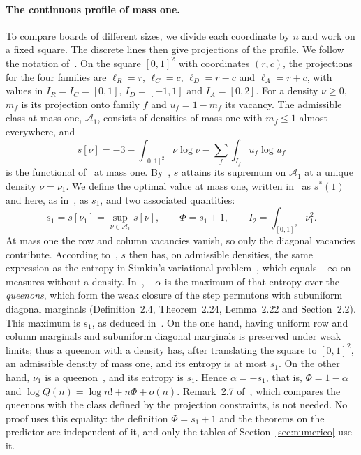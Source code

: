 \paragraph{The continuous profile of mass one.}
To compare boards of different sizes, we divide each coordinate by $n$ and work on a fixed square.
The discrete lines then give projections of the profile.
We follow the notation of~\cite{Perfil}. On the square $[0,1]^2$ with coordinates $(r,c)$, the
projections for the four families are $\ell_R=r$, $\ell_C=c$, $\ell_D=r-c$ and $\ell_A=r+c$, with
values in $I_R=I_C=[0,1]$, $I_D=[-1,1]$ and $I_A=[0,2]$. For a density $\nu\ge0$, $m_f$ is its
projection onto family $f$ and $u_f=1-m_f$ its vacancy. The admissible class at mass one,
$\mathcal A_1$, consists of densities of mass one with $m_f\le1$ almost everywhere, and
\[
 s[\nu]=-3-\int_{[0,1]^2}\nu\log\nu-\sum_{f}\int_{I_f}u_f\log u_f
\]
is the functional of~\cite[(1.1)]{Perfil} at mass one. By~\cite[Theorem~1.1]{Perfil}, $s$ attains its
supremum on $\mathcal A_1$ at a unique density $\nu=\nu_1$. We define the optimal value at mass
one, written in~\cite{Perfil} as $s^*(1)$ and here, as in~\cite{Completabilidad}, as $s_1$, and two
associated quantities:
\begin{equation}\label{eq:s1}
 s_1=s[\nu_1]=\sup_{\nu\in\mathcal A_1}s[\nu],\qquad \Phi=s_1+1,\qquad I_2=\int_{[0,1]^2}\nu_1^2 .
\end{equation}
At mass one the row and column vacancies vanish, so only the diagonal vacancies contribute.
According to~\cite[Remark~2.3]{Perfil}, $s$ then has, on admissible densities, the same expression as the
entropy
in Simkin's variational problem~\cite[Definition~2.9]{Simkin}, which equals $-\infty$ on measures without
a density. In~\cite{Simkin}, $-\alpha$ is the maximum of that entropy over the \emph{queenons}, which form
the
weak closure of the step permutons with subuniform diagonal marginals (Definition~2.4,
Theorem~2.24, Lemma~2.22 and Section~2.2). This maximum is $s_1$, as deduced
in~\cite[Section~2.4]{Completabilidad}. On the one hand, having uniform row and column marginals and
subuniform diagonal marginals is preserved under weak limits; thus a queenon with a density has, after
translating the square to $[0,1]^2$, an admissible density of mass one, and its entropy is at most $s_1$.
On the other hand, $\nu_1$ is a queenon~\cite[Lemma~2.4]{Completabilidad}, and its entropy is $s_1$.
Hence $\alpha=-s_1$, that is, $\Phi=1-\alpha$ and $\log Q(n)=\log n!+n\Phi+o(n)$. Remark~2.7
of~\cite{Simkin}, which compares the queenons with the class defined by the projection constraints, is
not needed. No proof uses this equality: the definition $\Phi=s_1+1$ and the theorems on the predictor
are independent of it, and only the tables of Section~\ref{sec:numerico} use it.

